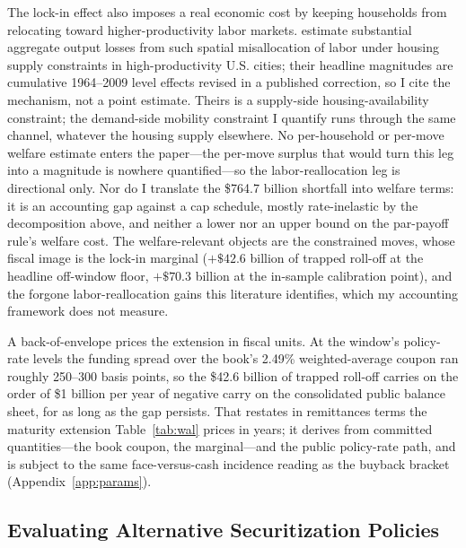 The lock-in effect also imposes a real economic cost by keeping households from relocating toward higher-productivity labor markets. \citet{hsieh2019} estimate substantial aggregate output losses from such spatial misallocation of labor under housing supply constraints in high-productivity U.S. cities; their headline magnitudes are cumulative 1964--2009 level effects revised in a published correction, so I cite the mechanism, not a point estimate. Theirs is a supply-side housing-availability constraint; the demand-side mobility constraint I quantify runs through the same channel, whatever the housing supply elsewhere. No per-household or per-move welfare estimate enters the paper---the per-move surplus that would turn this leg into a magnitude is nowhere quantified---so the labor-reallocation leg is directional only. Nor do I translate the \$764.7 billion shortfall into welfare terms: it is an accounting gap against a cap schedule, mostly rate-inelastic by the decomposition above, and neither a lower nor an upper bound on the par-payoff rule's welfare cost. The welfare-relevant objects are the constrained moves, whose fiscal image is the lock-in marginal ($+\$42.6$ billion of trapped roll-off at the headline off-window floor, $+\$70.3$ billion at the in-sample calibration point), and the forgone labor-reallocation gains this literature identifies, which my accounting framework does not measure.

A back-of-envelope prices the extension in fiscal units. At the window's policy-rate levels the funding spread over the book's 2.49\% weighted-average coupon ran roughly 250--300 basis points, so the \$42.6 billion of trapped roll-off carries on the order of \$1 billion per year of negative carry on the consolidated public balance sheet, for as long as the gap persists. That restates in remittances terms the maturity extension Table~\ref{tab:wal} prices in years; it derives from committed quantities---the book coupon, the marginal---and the public policy-rate path, and is subject to the same face-versus-cash incidence reading as the buyback bracket (Appendix~\ref{app:params}).

\subsection{Evaluating Alternative Securitization Policies}\label{sec:discussion-policy}

